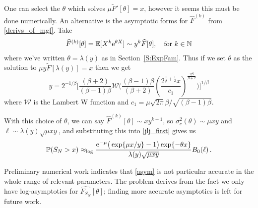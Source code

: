 One can select the $\theta$ which solves $\mu \widetilde{F}'[\theta]=x$, however it seems this must be done numerically.
An alternative is the asymptotic forms for $\widehat{F}^{(k)}$ from \eqref{derivs_of_mgf}. Take
\begin{align} \label{deriv_asymptotics}
	\widehat{F}^{(k)}[\theta] = \operatorname{{\mathbb E}}[X^k\mathrm{e}^{\theta X}]\sim y^k\widehat{F}[\theta], \quad \text{for } k \in {\mathbb N}
\end{align}
where we've written $\theta=\lambda(y)$ as in Section~\ref{S:ExpFam}. Thus if we set $\theta$ as the solution to $\mu y \widetilde{F}[\lambda(y)] = x$ then we get
\begin{equation} \label{y_approx}
y = 2^{-1/\beta } \Bigg[ \frac{(\beta +2) }{(\beta -1) \beta } \mathcal{W}\Bigg( \frac{(\beta -1) \beta }{(\beta +2)} \left(\frac{2^{\frac{1}{\beta }+\frac{1}{2}} x}{c_1}\right)^{\frac{2 \beta }{\beta +2}} \Bigg) \Bigg]^{1/\beta } 
\end{equation}
where $\mathcal{W} $ is the Lambert W function and $c_1 = \mu \sqrt{2 \pi } \beta   / \sqrt{(\beta -1) \beta }$.

With this choice of $\theta$, we can say $\widehat{F}^{(k)}[\theta] \sim x y^{k-1}$, so $\sigma_c^2(\theta) \sim \mu x y$ and $\ell \sim \lambda(y) \sqrt{\mu x y}$, and substituting this into \eqref{jlj_first} gives us
\begin{equation} \label{asym}
\operatorname{{\mathbb P}}(S_N > x) 
	\approx_{\log} \frac{
		\mathrm{e}^{-\mu} \big( \exp \{ \mu x / y \} - 1 \big) \exp \{ -\theta x \}
	}{
		\lambda(y) \sqrt{\mu x y}
	} B_0(\ell) \,.
\end{equation}

Preliminary numerical work indicates that \eqref{asym} is not particular accurate in the whole range of relevant parameters. 
The problem derives from the fact we only have log-asymptotics for $\widehat{F_{S_N}}[\theta]$; finding more accurate asymptotics is left for future work.


